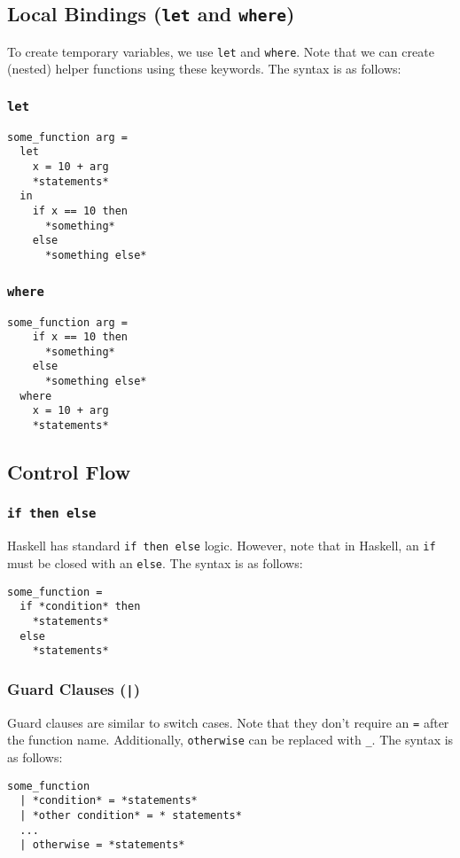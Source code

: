 \documentclass{article}
\begin{document}
\subsection{Local Bindings (\texttt{let} and \texttt{where})} To
create temporary variables, we use \texttt{let} and
\texttt{where}. Note that we can create (nested) helper functions
using these keywords. The syntax is as follows:

\subsubsection{\texttt{let}}
\begin{verbatim}
some_function arg =
  let
    x = 10 + arg
    *statements*
  in
    if x == 10 then
      *something*
    else
      *something else*
\end{verbatim}

\subsubsection{\texttt{where}}
\begin{verbatim}
some_function arg =
    if x == 10 then
      *something*
    else
      *something else*
  where
    x = 10 + arg
    *statements*
\end{verbatim}





\subsection{Control Flow}
\subsubsection{\texttt{if then else}} Haskell has standard \texttt{if
  then else} logic. However, note that in Haskell, an \texttt{if} must
be closed with an \texttt{else}. The syntax is as follows:
\begin{verbatim}
some_function = 
  if *condition* then
    *statements*
  else
    *statements*
\end{verbatim}





\subsubsection{Guard Clauses (\texttt{|})} Guard clauses are similar
to switch cases. Note that they don't require an \texttt{=} after the
function name. Additionally, \texttt{otherwise} can be replaced with
\texttt{\_}. The syntax is as follows:
\begin{verbatim}
some_function
  | *condition* = *statements*
  | *other condition* = * statements*
  ...
  | otherwise = *statements*
\end{verbatim}
\end{document}
